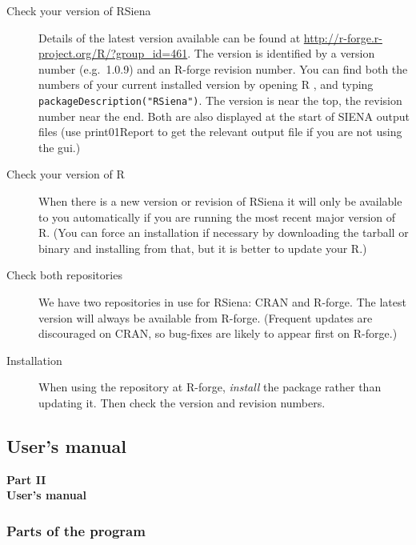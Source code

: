 \documentclass[a4paper,fleqn]{article}
\newcommand{\+}{\, + \,}
\newcommand{\sfn}[1]{\textsf{#1}}
\newcommand{\R}{{\sf R }}
\newcommand{\Rn}{{\sf R}}
\newcommand{\rs}{{\sf RSiena}}
\newcommand{\RS}{{\sf RSiena }}
\newcommand{\SI}{{\sf SIENA }}
\begin{document}
{\begin{description}
\item[Check your version of \RS] Details of the latest version available can
  be found at \url{http://r-forge.r-project.org/R/?group_id=461}. The version is
  identified by a version number (e.g.\ 1.0.9) and an R-forge revision
  number. You can find both the numbers of your current installed version by
  opening \R, and typing \verb|packageDescription("RSiena")|. The version is
  near the top, the revision number near the end. Both are also displayed at the
  start of \SI output files (use \sfn{print01Report} to get the relevant output
  file if you are not using the gui.)
\item[Check your version of \Rn] When there is a new version or revision of \RS
  it will only be available to you automatically if you are running the most
  recent major version of \Rn. (You can force an installation if
  necessary by downloading the tarball or binary and installing from that, but
  it is better to update your \Rn.)
\item [Check both repositories] We have two repositories in use for \rs: CRAN
  and R-forge. The latest version will always be available from
  R-forge. (Frequent updates are discouraged on CRAN, so bug-fixes are likely to
  appear first on R-forge.)
\item[Installation] When using the repository at R-forge, \emph{install} the
  package rather than updating it. Then check the version and revision numbers.
\end{description}


\newpage
\begin{print}
\part{User's manual}
\end{print}
\begin{screen}
{\color{section0}\LARGE\bf\noindent
Part II\\[1.5ex] User's manual\\[1.8ex]}
\end{screen}


\begin{print}
\end{print}

\section[Program parts]{Parts of the program}
\label{S_parts}

}
\end{document}
